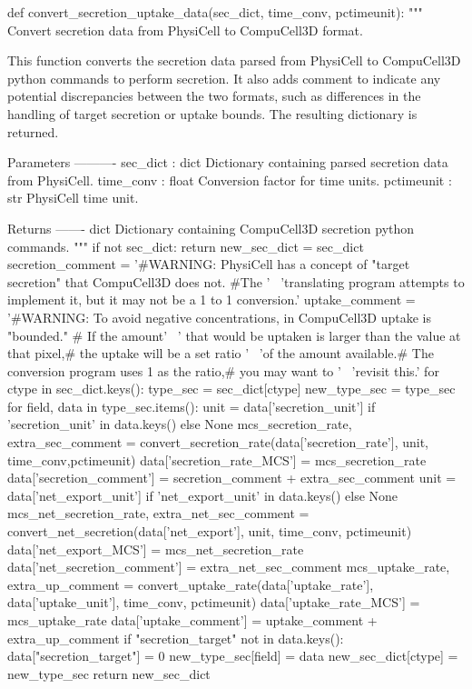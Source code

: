 \begin{python}
    def convert_secretion_uptake_data(sec_dict, time_conv, pctimeunit):
    """
    Convert secretion data from PhysiCell to CompuCell3D format.

    This function converts the secretion data parsed from PhysiCell to CompuCell3D python commands to perform
    secretion. It also adds comment to indicate any potential discrepancies between the two formats, such as
    differences in the handling of target secretion or uptake bounds. The resulting dictionary is returned.

    Parameters
    ----------
    sec_dict : dict
        Dictionary containing parsed secretion data from PhysiCell.
    time_conv : float
        Conversion factor for time units.
    pctimeunit : str
        PhysiCell time unit.

    Returns
    -------
    dict
        Dictionary containing CompuCell3D secretion python commands.
    """
    if not sec_dict:
        return {}
    new_sec_dict = sec_dict
    secretion_comment = '#WARNING: PhysiCell has a concept of "target secretion" that CompuCell3D does not. \n#The ' \
                        'translating program attempts to implement it, but it may not be a 1 to 1 conversion.'
    uptake_comment = '#WARNING: To avoid negative concentrations, in CompuCell3D uptake is "bounded." \n# If the amount' \
                     ' that would be uptaken is larger than the value at that pixel,\n# the uptake will be a set ratio ' \
                     'of the amount available.\n# The conversion program uses 1 as the ratio,\n# you may want to ' \
                     'revisit this.'
    for ctype in sec_dict.keys():
        type_sec = sec_dict[ctype]
        new_type_sec = type_sec
        for field, data in type_sec.items():
            unit = data['secretion_unit'] if 'secretion_unit' in data.keys() else None
            mcs_secretion_rate, extra_sec_comment = convert_secretion_rate(data['secretion_rate'], unit, 
                time_conv,pctimeunit)
            data['secretion_rate_MCS'] = mcs_secretion_rate
            data['secretion_comment'] = secretion_comment + extra_sec_comment
            unit = data['net_export_unit'] if 'net_export_unit' in data.keys() else None
            mcs_net_secretion_rate, extra_net_sec_comment = convert_net_secretion(data['net_export'], unit, 
                time_conv, pctimeunit)
            data['net_export_MCS'] = mcs_net_secretion_rate
            data['net_secretion_comment'] = extra_net_sec_comment
            mcs_uptake_rate, extra_up_comment = convert_uptake_rate(data['uptake_rate'], data['uptake_unit'], 
                time_conv, pctimeunit)
            data['uptake_rate_MCS'] = mcs_uptake_rate
            data['uptake_comment'] = uptake_comment + extra_up_comment
            if "secretion_target" not in data.keys():
                data["secretion_target"] = 0
            new_type_sec[field] = data
        new_sec_dict[ctype] = new_type_sec
    return new_sec_dict
\end{python}




